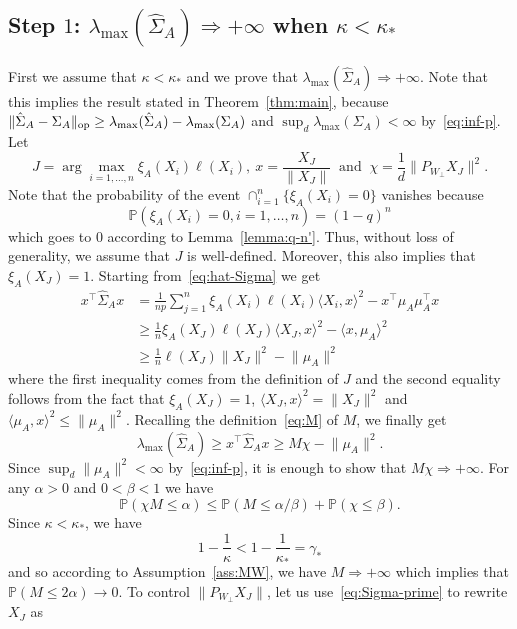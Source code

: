 \documentclass[]{article}
\renewcommand{\P}{\mathbb{P}}
\newcommand{\op}{{\rm op}}
\theoremstyle{plain}
\theoremstyle{definition}
\begin{document}
\subsection{Step $1$: $\lambda_{\max}(\hat \Sigma_A) \Rightarrow +\infty$ when $\kappa < \kappa_*$} \label{sub:step-1}

First we assume that $\kappa < \kappa_*$ and we prove that $\lambda_{\max}(\hat \Sigma_A) \Rightarrow +\infty$. Note that this implies the result stated in Theorem~\ref{thm:main}, because $\lVert \hat \Sigma_A - \Sigma_A \rVert_\op \geq \lambda_{\max}(\hat \Sigma_A) - \lambda_{\max}(\Sigma_A)$ and $\sup_d \lambda_{\max}(\Sigma_A) < \infty$ by~\eqref{eq:inf-p}. Let
\[ J = \arg \max_{i=1, \ldots, n} \xi_A(X_i) \ell(X_i),\ x = \frac{X_J}{\lVert X_J \rVert} \ \text{ and } \ \chi = \frac{1}{d} \lVert P_{W_\perp} X_J \rVert^2. \]
Note that the probability of the event $\cap_{i=1}^n \{\xi_A(X_i) = 0\}$ vanishes because
\[ \P \left( \xi_A(X_i) = 0, i = 1, \ldots, n \right) = (1-q)^n \]
which goes to $0$ according to Lemma~\ref{lemma:q-n'}. Thus, without loss of generality, we assume that $J$ is well-defined. Moreover, this also implies that $\xi_A(X_J) = 1$. Starting from~\eqref{eq:hat-Sigma} we get
\begin{align*}
	x^\top \hat \Sigma_A x & = \frac{1}{np} \sum_{j=1}^n \xi_A(X_i) \ell(X_i) \langle X_i, x \rangle^2 - x^\top \mu_A \mu_A^\top x\\
	& \geq \frac{1}{n} \xi_A(X_J) \ell(X_J) \langle X_J, x \rangle^2 - \langle x, \mu_A \rangle^2\\
	& \geq \frac{1}{n} \ell(X_J) \lVert X_J \rVert^2 - \lVert \mu_A \rVert^2
\end{align*}
where the first inequality comes from the definition of $J$ and the second equality follows from the fact that $\xi_A(X_J) = 1$, $\langle X_J, x \rangle^2 = \lVert X_J \rVert^2$ and $\langle \mu_A, x \rangle^2 \leq \lVert \mu_A \rVert^2$. Recalling the definition~\eqref{eq:M} of $M$, we finally get
\[ \lambda_{\max}(\hat \Sigma_A) \geq x^\top \hat \Sigma_A x \geq M \chi - \lVert \mu_A \rVert^2. \]
Since $\sup_d \lVert \mu_A \rVert^2 < \infty$ by~\eqref{eq:inf-p}, it is enough to show that $M \chi \Rightarrow +\infty$. For any $\alpha > 0$ and $0 < \beta < 1$ we have
\[ \P \left( \chi M \leq \alpha \right) \leq \P \left( M \leq \alpha/\beta \right) + \P \left( \chi \leq \beta \right). \]
Since $\kappa < \kappa_*$, we have
\[ 1 - \frac{1}{\kappa} < 1 - \frac{1}{\kappa_*} = \gamma_* \]
and so according to Assumption~\ref{ass:MW}, we have $M \Rightarrow +\infty$ which implies that $\P \left( M \leq 2\alpha \right) \to 0$. To control $\lVert P_{W_\perp} X_J \rVert$, let us use~\eqref{eq:Sigma-prime} to rewrite $X_J$ as
\end{document}
